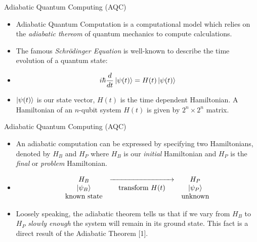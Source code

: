 \documentclass[
  ignorenonframetext,
]{beamer}
\providecommand{\tightlist}{%
  \setlength{\itemsep}{0pt}\setlength{\parskip}{0pt}}
\begin{document}
\begin{frame}{Adiabatic Quantum Computing (AQC)}
\protect\hypertarget{adiabatic-quantum-computing-aqc}{}

\begin{itemize}[<+->]
\tightlist
\item
  Adiabatic Quantum Computation is a computational model which relies on
  the \emph{adiabatic thereom} of quantum mechanics to compute
  calculations.
\item
  The famous \emph{Schrödinger Equation} is well-known to describe the
  time evolution of a quantum state:
\end{itemize}

\begin{itemize}[<+->]
\tightlist
\item
  \[
  i\hbar \frac{d}{dt} \ket{\psi (t)} = H(t) \ket{\psi(t)}
  \]
\end{itemize}

\begin{itemize}[<+->]
\tightlist
\item
  \(\ket{\psi(t)}\) is our state vector, \(H(t)\) is the time dependent
  Hamiltonian. A Hamiltonian of an \(n\)-qubit system \(H(t)\) is given
  by \(2^n \times 2^n\) matrix.
\end{itemize}

\end{frame}

\begin{frame}{Adiabatic Quantum Computing (AQC)}
\protect\hypertarget{adiabatic-quantum-computing-aqc-1}{}

\begin{itemize}[<+->]
\tightlist
\item
  An adiabatic computation can be expressed by specifying two
  Hamiltonians, denoted by \(H_B\) and \(H_P\) where \(H_B\) is our
  \emph{initial} Hamiltonian and \(H_P\) is the \emph{final} or
  \emph{problem} Hamiltonian.
\item
  \[\begin{matrix}
  H_B &  \xrightarrow{\hspace*{3cm}} & H_P \\
  \ket{\psi_B} &  \text{transform } H(t) &  \ket{\psi_P} \\ 
  \text{known state} &  &  \text{unknown}
  \end{matrix}
  \]
\item
  Loosely speaking, the adiabatic theorem tells us that if we vary from
  \(H_B\) to \(H_P\) \emph{slowly enough} the system will remain in its
  ground state. This fact is a direct result of the Adiabatic Theorem
  {[}1{]}.
\end{itemize}

\end{frame}
\end{document}
